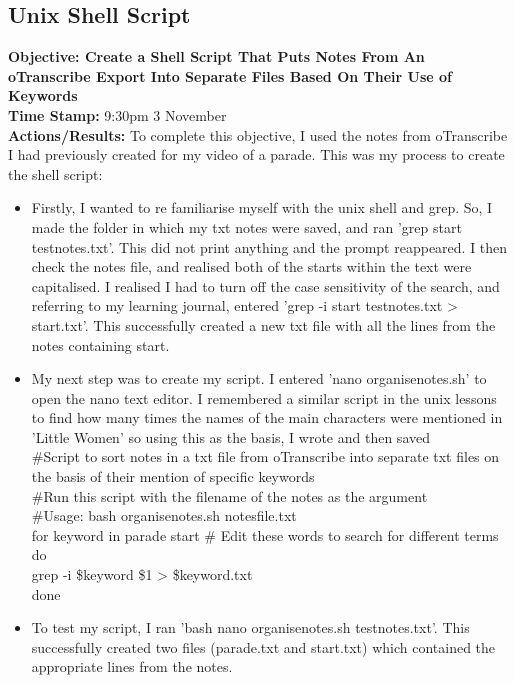 \documentclass{article}
\begin{document}
\begin{FlushLeft}
\pagebreak

\subsection{Unix Shell Script}
\textbf{Objective: Create a Shell Script That Puts Notes From An oTranscribe Export Into Separate Files Based On Their Use of Keywords}\\
\textbf{Time Stamp:} 9:30pm 3 November\\
\textbf{Actions/Results:} To complete this objective, I used the notes from oTranscribe I had previously created for my video of a parade. This was my process to create the shell script:
\begin{itemize}
    \item Firstly, I wanted to re familiarise myself with the unix shell and grep. So, I made the folder in which my txt notes were saved, and ran 'grep start test\textunderscore notes.txt'. This did not print anything and the prompt reappeared. I then check the notes file, and realised both of the starts within the text were capitalised. I realised I had to turn off the case sensitivity of the search, and referring to my learning journal, entered 'grep -i start test\textunderscore notes.txt \textgreater{} start.txt'. This successfully created a new txt file with all the lines from the notes containing start.
    \item My next step was to create my script. I entered 'nano organise\textunderscore notes.sh' to open the nano text editor. I remembered a similar script in the unix lessons to find how many times the names of the main characters were mentioned in 'Little Women' so using this as the basis, I wrote and then saved\\
    \#Script to sort notes in a txt file from oTranscribe into separate txt files on the basis of their mention of specific keywords\\
    \#Run this script with the filename of the notes as the argument\\
    \#Usage: bash organise\textunderscore notes.sh notesfile.txt\\
    for keyword in parade start \# Edit these words to search for different terms\\
    do\\
    grep -i \$keyword \$1 \textgreater{} \$keyword.txt\\
    done
    \item To test my script, I ran 'bash nano organise\textunderscore notes.sh test\textunderscore notes.txt'. This successfully created two files (parade.txt and start.txt) which contained the appropriate lines from the notes.

\end{itemize}
\end{FlushLeft}
\end{document}
